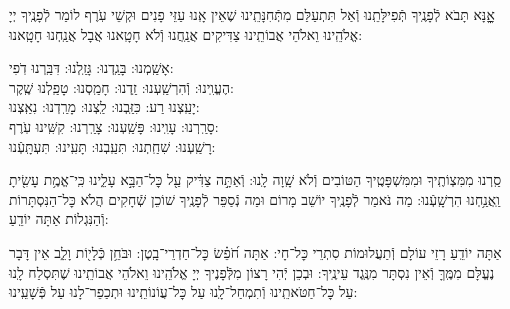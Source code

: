 \documentclass[twoside, openany, parskip=half, 11pt]{book}
\begin{document}
\begin{sometimes}
אׇׇׇׇָנָּא תָּבֹא לְֿפָנֶֽיךָ תְּֿפִילָּתֵֽנוּ וְֿאַל תִּתְעַלַּם מִתְּֿחִנָּתֵֽינוּ שֶׁאֵין אָֽנוּ עַזֵּי פָנִים וּקְשֵׁי עֹֽרֶף לוֹמַר לְֿפָנֶֽיךָ יְיָ אֱלֹהֵֽינוּ וֵאלֹהֵי אֲבוֹתֵֽינוּ צַדִּיקִים אֲנַֽחֲנוּ וְֿלֹא חָטָֽאנוּ אֲבָל אֲנַֽחְנוּ חָטָֽאנוּ:

אָשַֽׁמְנוּ: בָּגַֽדְנוּ: גָּזַֽלְנוּ: דִּבַּֽרְנוּ דֹֽפִי: \\
הֶעֱוִֽינוּ: וְֿהִרְשַֽׁעְנוּ: זַֽדְנוּ: חָמַֽסְנוּ: טָפַֽלְנוּ שֶֽׁקֶר:\\
יָעַֽצְנוּ רַע: כִּזַּֽבְנוּ: לַֽצְנוּ: מָרַֽדְנוּ: נִאַֽצְנוּ: \\
סָרַֽרְנוּ: עָוִֽינוּ: פָּשַֽׁעְנוּ: צָרַֽרְנוּ: קִשִּֽׁינוּ עֹֽרֶף:\\
רָשַֽׁעְנוּ: שִׁחַֽתְנוּ: תִּעַֽבְנוּ: תָּעִֽינוּ: תִּעְתָּֽעְֿנוּ:

סַֽרְנוּ מִמִּצְוֹתֶֽיךָ וּמִמִּשְׁפָּטֶֽיךָ הַטּוֹבִים וְֿלֹא שָֽׁוָה לָֽנוּ: וְֿאַתָּ֣ה צַדִּ֔יק עַ֖ל כׇּל־הַבָּ֣א עָלֵ֑ינוּ כִּֽי־אֱמֶ֥ת עָשִׂ֖יתָ וַֽאֲנַ֥חְנוּ הִרְשָֽׁעְֿנוּ: מַה נֹּאמַר לְֿפָנֶֽיךָ יוֹשֵׁב מָרוֹם וּמַה נְֿסַפֵּר לְֿפָנֶֽיךָ שׁוֹכֵן שְֿׁחָקִים הֲלֹא כׇּל־הַנִּסְתָּרוֹת וְֿהַנִּגְלוֹת אַתָּה יוֹדֵֽעַ:

אַתָּה יוֹדֵֽעַ רָזֵי עוֹלָם וְֿתַעֲלוּמוֹת סִתְרֵי כׇּל־חָי: אַתָּה חֹ֝פֵ֗שׂ כׇּל־חַדְרֵי־בָֽטֶן: וּבֹּחֵ֥ן כְּֿלָי֖וֹת וָלֵ֑ב אֵין דָּבָר נֶעֱלָּם מִמֶּֽךָּ וְֿאֵין נִסְתָּר מִנֶּֽגֶד עֵינֶֽיךָ: וּבְכֵן יְֿהִי רָצוֹן מִלְּֿפָנֶיךָ יְיָ אֱלֹהֵֽינוּ וֵאלֹהֵי אֲבוֹתֵֽינוּ שֶׁתִּסְלַח לָֽנוּ עַל כׇּל־חַטֹּאתֵֽינוּ וְֿתִמְחַל־לָֽנוּ עַל כׇּל־עֲוֹנוֹתֵֽינוּ וּתְכַפֵר־לָנוּ עַל פְּֿשָׁעֵֽינוּ:




\end{sometimes}
\end{document}
